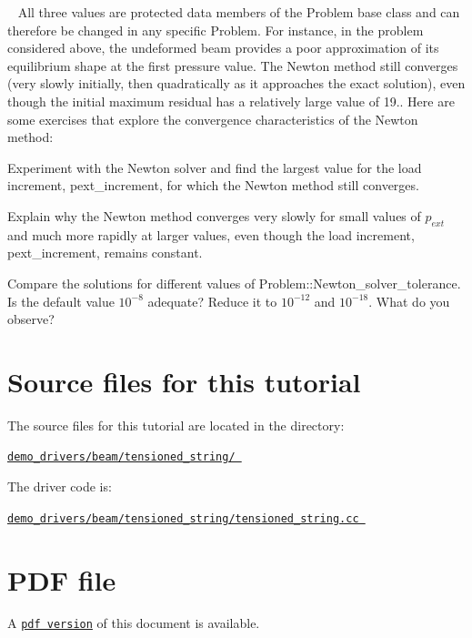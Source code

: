 \begin{DoxyEnumerate}
~\newline
 All three values are protected data members of the {\ttfamily Problem} base class and can therefore be changed in any specific {\ttfamily Problem}. For instance, in the problem considered above, the undeformed beam provides a poor approximation of its equilibrium shape at the first pressure value. The Newton method still converges (very slowly initially, then quadratically as it approaches the exact solution), even though the initial maximum residual has a relatively large value of 19.. Here are some exercises that explore the convergence characteristics of the Newton method\+:
\begin{DoxyEnumerate}
\item Experiment with the Newton solver and find the largest value for the load increment, {\ttfamily pext\+\_\+increment}, for which the Newton method still converges.
\item Explain why the Newton method converges very slowly for small values of $ p_{ext} $ and much more rapidly at larger values, even though the load increment, {\ttfamily pext\+\_\+increment}, remains constant.
\item Compare the solutions for different values of {\ttfamily Problem\+::\+Newton\+\_\+solver\+\_\+tolerance}. Is the default value $ 10^{-8} $ adequate? Reduce it to $ 10^{-12} $ and $ 10^{-18} $. What do you observe?
\end{DoxyEnumerate}
\end{DoxyEnumerate}



 

\hypertarget{index_sources}{}\section{Source files for this tutorial}\label{index_sources}

\begin{DoxyItemize}
\item The source files for this tutorial are located in the directory\+: \begin{center} \href{
../../../../
demo_drivers/beam/tensioned_string/
}{\tt demo\+\_\+drivers/beam/tensioned\+\_\+string/ } \end{center} 
\item The driver code is\+: \begin{center} \href{
../../../../
demo_drivers/beam/tensioned_string/tensioned_string.cc
}{\tt demo\+\_\+drivers/beam/tensioned\+\_\+string/tensioned\+\_\+string.\+cc } \end{center} 
\end{DoxyItemize}

 

 \hypertarget{index_pdf}{}\section{P\+D\+F file}\label{index_pdf}
A \href{../latex/refman.pdf}{\tt pdf version} of this document is available. 
